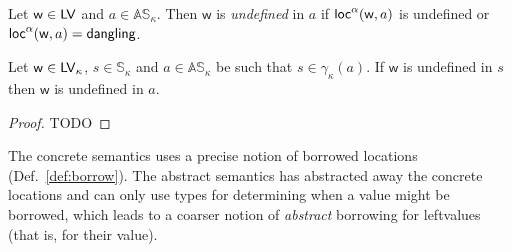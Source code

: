 \begin{definition}\label{def:abstract_undefined_leftvalues}
  Let $\mathsf{w}\in\mathsf{LV}$ and $a\in\mathbb{AS}_\kappa$. Then
  $\mathsf{w}$ is \emph{undefined} in $a$ if $\mathsf{loc}^\alpha(\mathsf{w},a)$ is undefined
  or $\mathsf{loc}^\alpha(\mathsf{w},a)=\mathsf{dangling}$.
\end{definition}

\begin{proposition}
  \label{prop:abstract_undefined_correctness}
  Let $\mathsf{w}\in\mathsf{LV}_\kappa$, $s\in\mathbb{S}_\kappa$
  and $a\in\mathbb{AS}_\kappa$ be
  such that $s\in\gamma_\kappa(a)$.
  If $\mathsf{w}$ is undefined in $s$ then $\mathsf{w}$ is undefined in $a$.
\end{proposition}
\begin{proof}
  TODO
\end{proof}

The concrete semantics uses a precise notion of borrowed locations
(Def.~\ref{def:borrow}). The abstract semantics has abstracted away the concrete locations
and can only use types for determining when a value might be borrowed, which leads
to a coarser notion of \emph{abstract} borrowing for leftvalues (that is, for their value).

